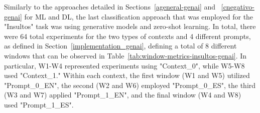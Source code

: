 

Similarly to the approaches detailed in Sections~\ref{ageneral-genai} and ~\ref{cnegativo-genai} for ML and DL, the last classification approach that was employed for the "Insultos" task was using generative models and zero-shot learning. In total, there were 64 total experiments for the two types of contexts and 4 different prompts, as defined in Section~\ref{implementation_genai}, defining a total of 8 different windows that can be observed in Table~\ref{tab:window-metrics-insultos-genai}. In particular, W1-W4 represented experiments using "Context\_0", while W5-W8 used "Context\_1." Within each context, the first window (W1 and W5) utilized "Prompt\_0\_EN", the second (W2 and W6) employed "Prompt\_0\_ES", the third (W3 and W7) applied "Prompt\_1\_EN", and the final window (W4 and W8) used "Prompt\_1\_ES".


